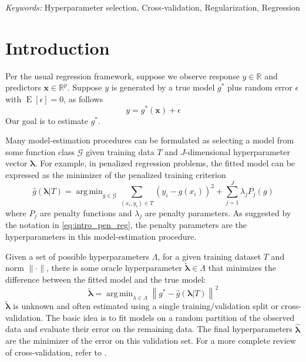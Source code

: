 \documentclass[12pt]{article}
\DeclareMathOperator*{\argmin}{arg\,min}
\begin{document}
\noindent%
{\it Keywords:}  Hyperparameter selection, Cross-validation, Regularization, Regression
\vfill

\newpage
{}
\section{Introduction}

Per the usual regression framework, suppose we observe response $y \in \mathbb{R}$ and predictors $\boldsymbol {x} \in \mathbb{R}^p$. Suppose $y$ is generated by a true model $g^*$ plus random error $\epsilon$ with $\operatorname{E}\left[\epsilon\right] = 0$, as follows
\begin{equation}
\label{true_model}
y = g^*(\boldsymbol x) + \epsilon
\end{equation}
Our goal is to estimate $g^*$.

Many model-estimation procedures can be formulated as selecting a model from some function class $\mathcal{G}$ given training data $T$ and $J$-dimensional hyperparameter vector $\boldsymbol{\lambda}$. For example, in penalized regression problems, the fitted model can be expressed as the minimizer of the penalized training criterion
\begin{equation}
\label{eq:intro_pen_reg}
\hat{g}(\boldsymbol \lambda | T) = \argmin_{g\in \mathcal{G}} \sum_{(x_i, y_i) \in T} \left (y_i -  g(x_i) \right )^2 + \sum_{j=1}^J \lambda_j P_j(g)
\end{equation}
where $P_j$ are penalty functions and $\lambda_j$ are penalty parameters. As suggested by the notation in \eqref{eq:intro_pen_reg}, the penalty parameters are the hyperparameters in this model-estimation procedure.

Given a set of possible hyperparameters $\Lambda$, for a given training dataset $T$ and norm $\|\cdot\|$, there is some oracle hyperparameter $\tilde{\boldsymbol{\lambda}} \in \Lambda$ that minimizes the difference between the fitted model and the true model:
\[
\tilde{\boldsymbol{\lambda}} = \argmin_{\lambda \in \Lambda} \left\|g^{*} - \hat{g}\left(\boldsymbol{\lambda|}T\right)\right\|^2
\]
$\tilde{\boldsymbol{\lambda}}$ is unknown and often estimated using a single training/validation split or cross-validation. The basic idea is to fit models on a random partition of the observed data and evaluate their error on the remaining data. The final hyperparameters $\hat{\boldsymbol{\lambda}}$ are the minimizer of the error on this validation set. For a more complete review of cross-validation, refer to \citet{arlot2010survey}.
\end{document}
